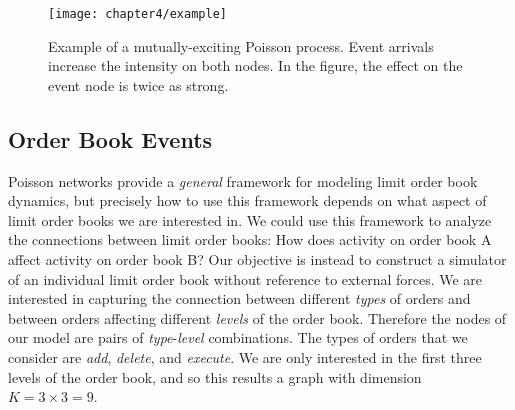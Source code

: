 \begin{figure}[t]
\small
\linespread{1}
\centering
\label{fig:example_chapter4}
\texttt{[image: chapter4/example]}
\captionsetup{skip=-30pt, labelsep=colon, font=footnotesize, width=\linewidth}
\caption[Example of a mutually-exciting Poisson process.]{Example of a mutually-exciting Poisson process. Event arrivals increase the intensity on both nodes. In the figure, the effect on the event node is twice as strong.}
\end{figure}


\subsection{Order Book Events}
Poisson networks provide a \textit{general} framework for modeling limit order book dynamics, but precisely how to use this framework depends on what aspect of limit order books we are interested in. We could use this framework to analyze the connections between limit order books: How does activity on order book A affect activity on order book B? Our objective is instead to construct a simulator of an individual limit order book without reference to external forces. We are interested in capturing the connection between different \textit{types} of orders and between orders affecting different \textit{levels} of the order book. Therefore the nodes of our model are pairs of \textit{type}-\textit{level} combinations. The types of orders that we consider are \textit{add}, \textit{delete}, and \textit{execute}. We are only interested in the first three levels of the order book, and so this results a graph with dimension $K = 3 \times 3 = 9$.

